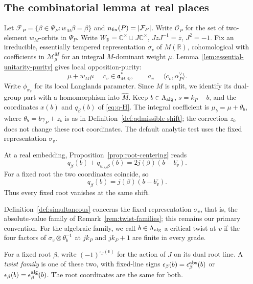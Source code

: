 \documentclass[12pt]{amsart}
\numberwithin{equation}{section}
\theoremstyle{plain}
\theoremstyle{definition}
\theoremstyle{remark}
\renewcommand{\bar}{\overline}
\newcommand{\C}{\mathbb C}
\newcommand{\R}{\mathbb R}
\newcommand{\cM}{\mathcal M}
\begin{document}
\subsection{The combinatorial lemma at real places}\label{subsec:real-criterion}
Let $\mathcal F_P=\{\beta\in\Psi_P:w_M\beta=\beta\}$ and $n_{\rm fix}(P)=|\mathcal F_P|$. Write $\mathcal O_P$ for the set of two-element $w_M$-orbits in $\Psi_P$.
Write $W_\R=\C^\times\sqcup J\C^\times$, $JzJ^{-1}=\bar z$, $J^2=-1$. Fix an irreducible, essentially tempered representation $\sigma_v$ of $M(\R)$, cohomological with coefficients in $\cM_\mu^M$ for an integral $M$-dominant weight $\mu$. Lemma~\ref{lem:essential-unitarity-purity} gives local opposition-purity:
\[
 \mu+w_M\mu=c_v\in\mathfrak a_{M,\mathbb Q}^*,\qquad
 a_v=\langle c_v,\alpha_P^\vee\rangle.
\]
Write $\phi_{\sigma_v}$ for its local Langlands parameter. Since $M$ is split, we identify its dual-group part with a homomorphism into $\widehat M$. Keep $b\in\Lambda_{\rm alg}$, $s=k_P-b$, and the coordinates $x(b)$ and $q_\beta(b)$ of \eqref{eq:q-H}. The integral coefficient is $\mu_b=\mu+\theta_b$, where $\theta_b=b\gamma_P+z_b$ is as in Definition~\ref{def:admissible-shift}; the correction $z_b$ does not change these root coordinates. The default analytic test uses the fixed representation $\sigma_v$.

At a real embedding, Proposition~\ref{prop:root-centering} reads
\begin{equation}\label{eq:real-centering}
 q_\beta(b)+q_{w_M\beta}(b)=2j(\beta)(b-b_v^\circ).
\end{equation}
For a fixed root the two coordinates coincide, so
\begin{equation}\label{eq:fixed-wall}
 q_\beta(b)=j(\beta)(b-b_v^\circ).
\end{equation}
Thus every fixed root vanishes at the same shift.

Definition~\ref{def:simultaneous} concerns the fixed representation $\sigma_v$, that is, the absolute-value family of Remark~\ref{rem:twist-families}; this remains our primary convention. For the algebraic family, we call $b\in\Lambda_{\rm alg}$ a critical twist at $v$ if the four factors of $\sigma_v\otimes\theta_b^{-1}$ at $jk_P$ and $jk_P+1$ are finite in every grade.

For a fixed root $\beta$, write $(-1)^{\epsilon_\beta(0)}$ for the action of $J$ on its dual root line. A \emph{twist family} is one of these two, with fixed-line signs $\epsilon_\beta(b)=\epsilon_\beta^{\rm abs}(b)$ or $\epsilon_\beta(b)=\epsilon_\beta^{\rm alg}(b)$. The root coordinates are the same for both.
\end{document}
